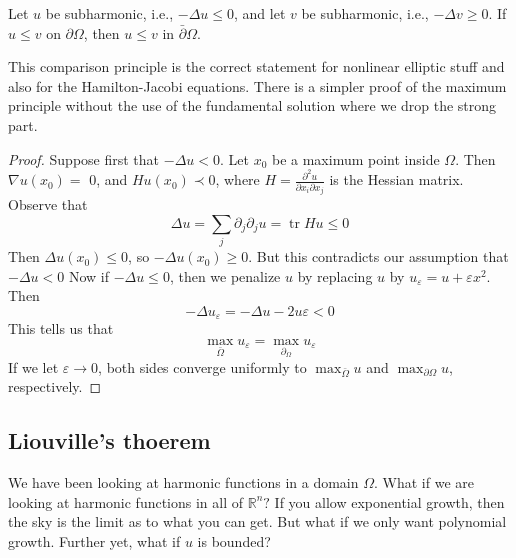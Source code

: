 \begin{corollary}
    Let $u$ be subharmonic, i.e., $-\Delta u \leq 0$, and let $v$ be subharmonic, i.e., $-\Delta v \geq 0$. If $u \leq v$ on $\partial \Omega$, then $u \leq v$ in $\bar{\partial} \Omega$.
\end{corollary}

This comparison principle is the correct statement for nonlinear elliptic stuff and also for the Hamilton-Jacobi equations. There is a simpler proof of the maximum principle without the use of the fundamental solution where we drop the strong part.

\vspace{1em}
\begin{proof}
Suppose first that $-\Delta u<0 .$ Let $x_{0}$ be a maximum point inside $\Omega .$ Then $\nabla u\left(x_{0}\right)=$ 0, and $H u\left(x_{0}\right) \prec 0$, where $H=\frac{\partial^{2} u}{\partial x_{i} \partial x_{j}}$ is the Hessian matrix. Observe that
$$
\Delta u=\sum_{j} \partial_{j} \partial_{j} u=\operatorname{tr} H u \leq 0
$$
Then $\Delta u\left(x_{0}\right) \leq 0$, so $-\Delta u\left(x_{0}\right) \geq 0 .$ But this contradicts our assumption that $-\Delta u<0$ Now if $-\Delta u \leq 0$, then we penalize $u$ by replacing $u$ by $u_{\varepsilon}=u+\varepsilon x^{2} .$ Then
$$
-\Delta u_{\varepsilon}=-\Delta u-2 u \varepsilon<0
$$
This tells us that
$$
\max _{\bar{\Omega}} u_{\varepsilon}=\max _{\partial_{\Omega}} u_{\varepsilon}
$$
If we let $\varepsilon \rightarrow 0$, both sides converge uniformly to $\max _{\bar{\Omega}} u$ and $\max _{\partial \Omega} u$, respectively.
\end{proof}

\subsection{Liouville's thoerem}
We have been looking at harmonic functions in a domain $\Omega$. What if we are looking at harmonic functions in all of $\mathbb{R}^{n} ?$ If you allow exponential growth, then the sky is the limit as to what you can get. But what if we only want polynomial growth. Further yet, what if $u$ is bounded?


